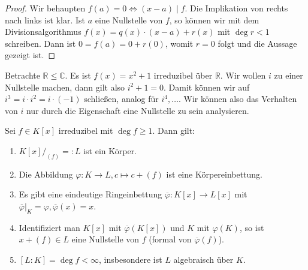 \begin{proof}
    Wir behaupten $f(a) = 0 \Leftrightarrow (x-a) \mid f$. Die Implikation von rechts nach links ist klar. Ist $a$ eine Nullstelle von $f$, so können wir mit dem Divisionsalgorithmus $f(x) = q(x) \cdot (x-a) + r(x)$ mit $\deg r < 1$ schreiben. Dann ist $0 = f(a) = 0 + r(0)$, womit $r = 0$ folgt und die Aussage gezeigt ist.
\end{proof}

\begin{example}
    Betrachte $\mathbb{R} \leq \mathbb{C}$. Es ist $f(x) = x^2 + 1$ irreduzibel über $\mathbb{R}$. Wir wollen $i$ zu einer Nullstelle machen, dann gilt also $i^2 + 1 = 0$. Damit können wir auf $i^3 = i \cdot i^2 = i \cdot (-1)$ schließen, analog für $i^4, \hdots$. Wir können also das Verhalten von $i$ nur durch die Eigenschaft eine Nullstelle zu sein analysieren.
\end{example}

\begin{proposition}[Kronecker]\label{proposition:Kronecker}
    Sei $f \in K[x]$ irreduzibel mit $\deg f\geq 1$. Dann gilt:
    \begin{enumerate}
        \item $K[x] /_{(f)} =: L$ ist ein Körper.
        \item Die Abbildung $\varphi : K \to L, c \mapsto c + (f)$ ist eine Körpereinbettung.
        \item Es gibt eine eindeutige Ringeinbettung $\overline{\varphi} : K[x] \to L[x]$ mit $\overline{\varphi} \vert_K = \varphi, \overline{\varphi}(x) = x$.
        \item Identifiziert man $K[x]$ mit $\overline{\varphi}(K[x])$ und $K$ mit $\varphi(K)$, so ist
        $x + (f) \in L$  eine Nullstelle von $f$ (formal von $\overline{\varphi}(f)$).
        \item $[L : K] = \deg f < \infty$, insbesondere ist $L$ algebraisch über $K$.
    \end{enumerate}
\end{proposition}
 
